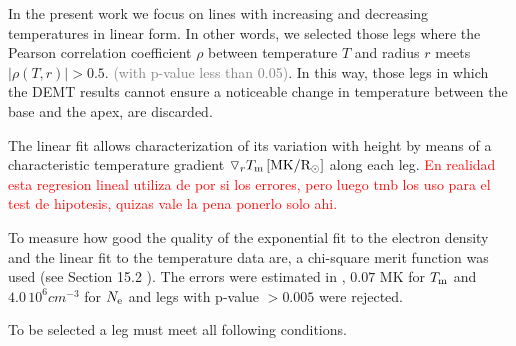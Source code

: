 \documentclass[namedreferences]{solarphysics}
\newcommand{\mrsun}{{\rm R_\odot}}
\newcommand{\MK}{{\rm MK}}
\newcommand{\dr}{\triangledown_r}
\newcommand{\Tm}{T_{\rm m}}
\newcommand{\Ne}{N_{\rm e}}
\newcommand{\rhoTr}{\rho(T,r)}
\def\diego#1{\textcolor{red}{#1}}
\def\temp#1{\textcolor{gray}{#1}}
\begin{document}
\begin{article}
In the present work we focus on lines with increasing and decreasing temperatures in linear form. In other words, we selected those legs where the {Pearson correlation coefficient $\rho$ between temperature $T$ and radius $r$ meets $|\rhoTr| > 0.5$}. \temp{(with p-value less than 0.05)}. In this way, those legs in which the DEMT results cannot ensure a noticeable change in temperature between the base and the apex, are discarded.


The linear fit allows characterization of its variation with height by means of a characteristic temperature gradient $\dr \Tm\,[\MK/\mrsun]$ along each leg.
\diego{En realidad esta regresion lineal utiliza de por si los errores, pero luego tmb los uso para el test de hipotesis, quizas vale la pena ponerlo solo ahi.}


To measure how good the quality of the exponential fit to the electron density and the linear fit to the temperature data are, a chi-square merit function was used (see Section 15.2 \citet{recipes}). The errors were estimated in \citet{lloveras_2017}, $0.07$ MK for $\Tm$ and $4.0\,10^6 cm^{-3}$ for $\Ne$ and legs with p-value $>0.005$ were rejected. 



{To be selected a leg must meet all following conditions.}

\begin{enumerate}


\end{enumerate}
\end{article}
\end{document}
